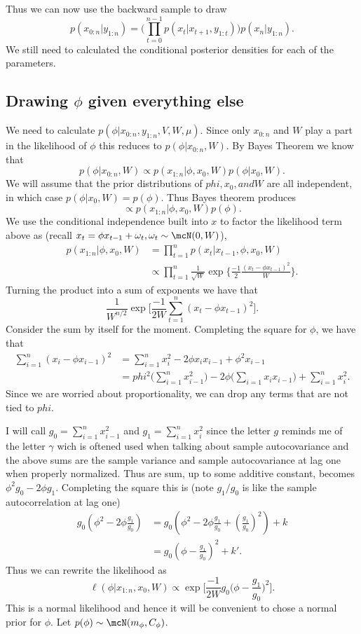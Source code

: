 \documentclass{article}
\begin{document}
Thus we can now use the backward sample to draw
\[
p(x_{0:n} | y_{1:n}) 
= \Big( \prod_{t=0}^{n-1} p(x_t | x_{t+1}, y_{1:t} ) \Big) p(x_n | y_{1:n}).
\]
We still need to calculated the conditional posterior densities for each of the parameters.

\subsection{Drawing $\phi$ given everything else}

We need to calculate $p(\phi | x_{0:n}, y_{1:n}, V, W, \mu)$.  Since only $x_{0:n}$ and $W$ play a part in the likelihood of $\phi$ this reduces to $p(\phi | x_{0:n}, W)$.  By Bayes Theorem we know that
\[
p(\phi | x_{0:n}, W) \propto p(x_{1:n} | \phi, x_0, W) p(\phi | x_0, W).
\]
We will assume that the prior distributions of $phi, x_0, and W$ are all independent, in which case $p(\phi | x_0, W) = p(\phi)$.  Thus Bayes theorem produces
\[
\propto p(x_{1:n} | \phi, x_0, W) p(\phi).
\]
We use the conditional independence built into $x$ to factor the likelihood term above as (recall $x_t = \phi x_{t-1} + \omega_t, \omega_t \sim \mcN(0,W)$),
\begin{align*}
p(x_{1:n} | \phi, x_0, W) 
& = \prod_{t=1}^n p(x_t | x_{t-1}, \phi, x_0, W) \\
& \propto \prod_{t=1}^n \frac{1}{\sqrt{W}} \exp \Big\{ \frac{-1}{2} \frac{(x_t - \phi x_{t-1})^2}{W} \Big\}.
\end{align*}
Turning the product into a sum of exponents we have that
\[
\frac{1}{W^{n/2}} \exp \Big[ \frac{-1}{2W} \sum_{t=1}^n (x_t - \phi x_{t-1})^2 \Big].
\]
Consider the sum by itself for the moment.  Completing the square for $\phi$, we have that
\begin{align*}
\sum_{i=1}^n (x_i - \phi x_{i-1})^2 
& = \sum_{i=1}^n x_i^2 - 2 \phi x_i x_{i-1} + \phi^2 x_{i-1} \\
& = phi^2 \Big( \sum_{i=1}^n x_{i-1}^2 \Big) - 2 \phi \Big( \sum_{i=1} x_i x_{i-1} \Big) + \sum_{i=1}^n x_i^2.
\end{align*}
Since we are worried about proportionality, we can drop any terms that are not tied to $phi$.

I will call 
\(
g_0 = \sum_{i=1}^n x_{i-1}^2
\)
and 
\(
g_1 = \sum_{i=1}^n x_i^2
\)
since the letter $g$ reminds me of the letter $\gamma$ wich is oftened used when talking about sample autocovariance and the above sums are  the sample variance and sample autocovariance at lag one when properly normalized.  Thus are sum, up to some additive constant, becomes
\(
\phi^2 g_0 - 2 \phi g_1.
\)
Completing the square this is (note $g_1/g_0$ is like the sample autocorrelation at lag one)
\begin{align*}
g_0 (\phi^2 - 2 \phi \frac{g_1}{g_0} ) 
& = g_0 ( \phi^2 - 2 \phi \frac{g_1}{g_0} + (\frac{g_1}{g_0})^2 ) + k \\
& = g_0 (\phi - \frac{g_1}{g_0})^2 + k'.
\end{align*}
Thus we can rewrite the likelihood as
\[
\ell (\phi | x_{1:n}, x_0, W) \propto \exp \Big[ \frac{-1}{2W} g_0 \Big( \phi - \frac{g_1}{g_0} \Big)^2 \Big].
\]
This is a normal likelihood and hence it will be convenient to chose a normal prior for $\phi$.  Let $p(\phi) \sim \mcN(m_\phi, C_\phi)$.  
\end{document}

